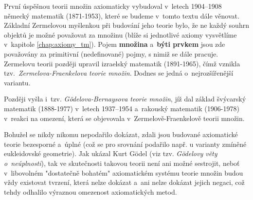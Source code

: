 První úspěšnou teorii množin axiomaticky vybudoval v~letech 1904--1908 německý matematik  \mbox{(1871-1953)}, které se budeme v~tomto textu dále věnovat. Základní Zermelovou myšlenkou při budování jeho teorie bylo, že ne každý souhrn objektů je možné považovat za množinu (blíže si jednotlivé axiomy vysvětlíme v~kapitole \ref{chap:axiomy_tm}). Pojem \textbf{množina} a~\textbf{býti prvkem} jsou zde považovány za primitivní (nedefinované) pojmy, s nimiž se dále pracuje. Zermelovu teorii později upravil izraelský matematik  \mbox{(1891-1965)}, čímž vznikla tzv.~\emph{\mbox{Zermelova-Fraenkelova} teorie množin}. Dodnes se jedná o~nejrozšířenější variantu.\par
Později vyšla i~tzv. \emph{Gödelova-Bernaysova teorie množin}, jíž dal základ švýcarský matematik  \mbox{(1888-1977)} v~letech 1937--1954 a~rakouský matematik  \mbox{(1906-1978)} v~reakci na omezení, která se objevovala v~\mbox{Zermelově-Fraenkelově} teorii množin.

Bohužel se nikdy nikomu nepodařilo dokázat, zdali jsou budované axiomatické teorie bezesporné a~úplné (což se pro srovnání podařilo např. u varianty zmíněné eukleidovské geometrie). Jak ukázal Kurt Gödel (viz tzv. \emph{Gödelovy věty o~neúplnosti}), tak ve skutečnosti takovou teorii není ani možné sestrojit, neboť v~libovolném "dostatečně bohatém" axiomatickém systému teorie množin budou vždy existovat tvrzení, která nelze dokázat a~ani nelze dokázat jejich negaci, což tehdy odhalilo výraznou omezenost axiomatických metod. 